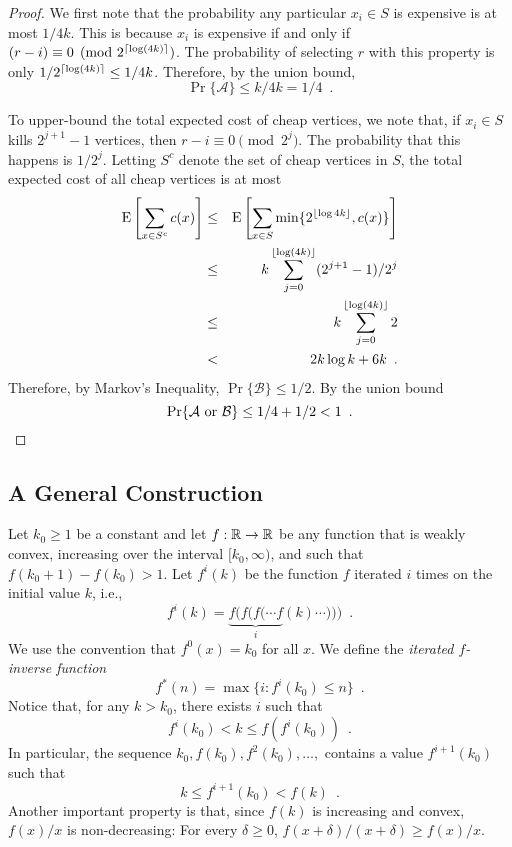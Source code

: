 \documentclass{patmorin}
\begin{document}
\begin{proof}
  We first note that the probability any particular $x_i\in S$ is
  expensive is at most $1/4k$.  This is because $x_i$ is expensive if and
  only if $(r-i)\equiv 0 \pmod {2^{{\lceil \log(4k) \rceil}}}$.  The probability
  of selecting $r$ with this property is only $1/2^{{\lceil \log(4k) \rceil}}
  \le 1/4k$. Therefore, by the union bound,
  \[
     \Pr\{\mathcal{A}\} \le k/4k = 1/4 \enspace .
  \]

  To upper-bound the total expected cost of cheap vertices, we note that,
  if $x_i\in S$ kills $2^{j+1}-1$ vertices, then $r-i\equiv 0\pmod{2^j}$.
  The probability that this happens is $1/2^{j}$. 
  Letting $S^{c}$
  denote the set of cheap vertices in $S$, the total expected cost of
  all cheap vertices is at most
  \begin{eqnarray*}
     \mathrm{E}\left[\sum_{x\in S^{c}}c(x) \right] 
     &\le& \mathrm{E}\left[\sum_{x\in S}\min\{2^{{\lfloor \log 4k \rfloor}},c(x)\} \right]  \\
    &\le&  k\sum_{j=0}^{{\lfloor \log (4k) \rfloor}} (2^{j+1}-1)/2^j \\
     &\le& k\sum_{j=0}^{{\lfloor \log (4k) \rfloor}} 2 \\
     &<& 2k\log k + 6k \enspace .
  \end{eqnarray*}
  Therefore, by Markov's Inequality, $\Pr\{\mathcal{B}\}\le 1/2$.
  By the union bound
  \[
     \Pr\{\mbox{$\mathcal{A}$ or $\mathcal{B}$}\} \le 1/4+ 1/2 < 1
  \enspace . \qedhere
  \]
\end{proof}

\subsection{A General Construction}

Let $k_0\ge 1$ be a constant and let $f:\mathbb{R}\rightarrow\mathbb{R}$ be any function
that is weakly convex, increasing over the interval $[k_0,\infty)$,
and such that $f(k_0+1)-f(k_0) > 1$.  Let $f^{i}(k)$ be the function $f$
iterated $i$ times on the initial value $k$, i.e.,
\[
   f^{i}(k) = \underbrace{f(f(f(\cdots f}_{i}(k)\cdots))) \enspace .
\]
We use the convention that $f^0(x) = k_0$ for all $x$.  We define the
\emph{iterated $f$-inverse function}
\[
   f^*(n) = \max\{i : f^{i}(k_0) \le n\} \enspace .
\] 
Notice that, for any $k> k_0$, there exists $i$ such that
\[
   f^i(k_0) < k \le f(f^i(k_0)) \enspace .
\]
In particular, the sequence $k_0,f(k_0),f^2(k_0),\ldots,$ contains
a value $f^{i+1}(k_0)$ such that
\[
      k  \le  f^{i+1}(k_0) < f(k) \enspace .
\]
Another important property is that, since $f(k)$ is increasing
and convex, $f(x)/x$ is non-decreasing: For every $\delta\ge 0$,
$f(x+\delta)/(x+\delta) \ge f(x)/x$.
\end{document}
